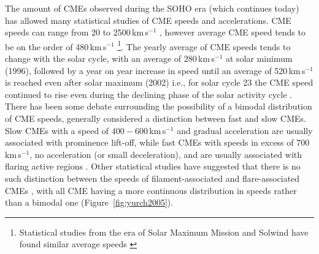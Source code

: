 The amount of CMEs observed during the SOHO era (which continues today) has allowed many statistical studies of CME speeds and accelerations. CME speeds can range from 20 to 2500\,km\,s$^{-1}$ \citep{gopal2004}, however average CME speed tends to be on the order of 480\,km\,s$^{-1}$ \citep{yurch2005, webb2012}\footnote{Statistical studies from the era of Solar Maximum Mission and Solwind have found similar average speeds \citep{burk2004}}. The yearly average of CME speeds tends to change with the solar cycle, with an average of 280\,km\,s$^{-1}$ at solar minimum (1996), followed by a year on year increase in speed until an average of 520\,km\,s$^{-1}$ is reached even after solar maximum (2002) i.e., for solar cycle 23 the CME speed continued to rise even during the declining phase of the solar activity cycle \citep{yashiro2004}. There has been some debate surrounding the possibility of a bimodal distribution of CME speeds, generally considered a distinction between fast and slow CMEs. Slow CMEs with a speed of $400-600$\,km\,s$^{-1}$ and gradual acceleration are usually associated with prominence lift-off, while fast CMEs with speeds in excess of 700\,km\,s$^{-1}$, no acceleration (or small deceleration), and are usually associated with flaring active regions \citep{shee1999, gopal2004, moon2000}. Other statistical studies have suggested that there is no such distinction between the speeds of filament-associated and flare-associated CMEs \citep{vrsna2005, yurch2005}, with all CME having a more continuous distribution in speeds rather than a bimodal one (Figure~\ref{fig:yurch2005}). 
